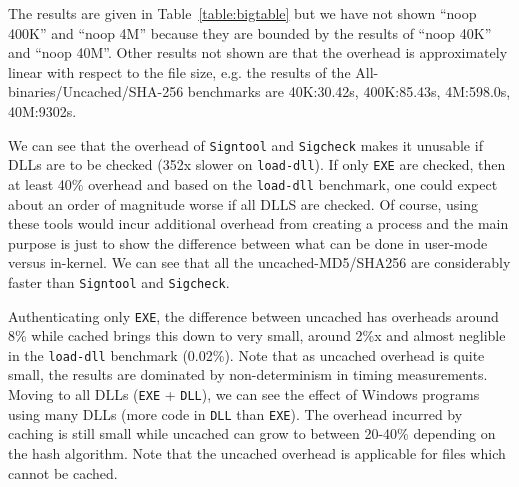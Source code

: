 The results are given in Table~\ref{table:bigtable} but
we have not shown ``noop 400K'' and ``noop 4M''
because they are bounded by the results of ``noop 40K'' and ``noop 40M''.
Other results not shown are that the overhead is approximately
linear with respect to the file size, e.g.
the results of the All-binaries/Uncached/SHA-256 benchmarks are
40K:30.42s, 400K:85.43s, 4M:598.0s, 40M:9302s.

We can see that the overhead of {\tt Signtool} and {\tt Sigcheck} makes
it unusable if DLLs are to be checked (352x slower on {\tt load-dll}).
If only {\tt EXE} are checked, then at least 40\% overhead and based
on the {\tt load-dll} benchmark, one could expect about an order
of magnitude worse if all DLLS are checked.
Of course, using these tools would incur additional overhead from creating
a process and the main purpose is just to show the difference
between what can be done in user-mode versus in-kernel.
We can see that all the uncached-MD5/SHA256 are considerably faster
than {\tt Signtool} and {\tt Sigcheck}.

Authenticating only {\tt EXE}, the difference between uncached has overheads
around 8\% while cached brings this down to very small, around 2\%x and almost
neglible in the {\tt load-dll} benchmark (0.02\%).
Note that as uncached overhead is quite small, the results are dominated
by non-determinism in timing measurements.
Moving to all DLLs ({\tt EXE} + {\tt DLL}), we can see the effect of Windows
programs using many DLLs (more code in {\tt DLL} than {\tt EXE}).
The overhead incurred by caching is still small while uncached can grow
to between 20-40\% depending on the hash algorithm.
Note that the uncached overhead is applicable for files which cannot be cached.



